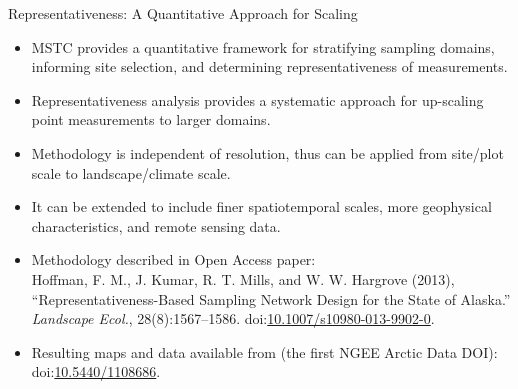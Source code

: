 \begin{frame}{Representativeness: A Quantitative Approach for Scaling}
 \begin{itemize}
  \item MSTC provides a quantitative framework for stratifying sampling domains, informing site selection, and determining representativeness of measurements.
  \item Representativeness analysis provides a systematic approach for up-scaling point measurements to larger domains.
  \item Methodology is independent of resolution, thus can be applied from site/plot scale to landscape/climate scale.
  \item It can be extended to include finer spatiotemporal scales, more geophysical characteristics, and remote sensing data.
  \item Methodology described in Open Access paper: \\
  \textrm{\small Hoffman, F. M., J. Kumar, R. T. Mills, and W. W. Hargrove (2013), ``Representativeness-Based Sampling Network Design for the State of Alaska.'' \textit{Landscape Ecol.}, 28(8):1567--1586. doi:\href{http://dx.doi.org/10.1007/s10980-013-9902-0}{10.1007/s10980-013-9902-0}.}
  \nocite{Hoffman_LandscapeEcol_20131001}
  \item Resulting maps and data available from (the first NGEE Arctic Data DOI): \textrm{\small doi:\href{http://dx.doi.org/10.5440/1108686}{10.5440/1108686}}.
 \end{itemize}

\end{frame}
